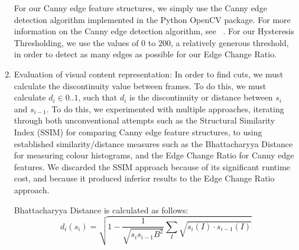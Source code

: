 \documentclass[12pt]{article}
\begin{document}
\begin{enumerate}
    For our Canny edge feature structures, we simply use the Canny edge detection algorithm implemented in the Python OpenCV package. For more information on the Canny edge 
    detection algorithm, see ~\cite{canny}. For our Hysteresis Thresholding, we use the values of $0$ to $200$, a relatively generous threshold, in order to detect as many edges 
    as possible for our Edge Change Ratio. 
    \item Evaluation of visual content representation: In order to find cuts, we must calculate the discontinuity value between frames. To do this, we must calculate 
    $d_i \in 0 .. 1$, such that $d_i$ is the discontinuity or distance between $s_i$ and $s_{i-1}$. To do this, we experimented with multiple approaches, iterating through 
    both unconventional attempts such as the Structural Similarity Index (SSIM) for comparing Canny edge feature structures, to using established similarity/distance measures such 
    as the Bhattacharyya Distance for measuring colour histograms, and the Edge Change Ratio for Canny edge features. We discarded the SSIM approach because
    of its significant runtime cost, and because it produced inferior results to the Edge Change Ratio approach.

    Bhattacharyya Distance is calculated as follows: 
    $$d_i(s_i) = \sqrt{1 - \frac{1}{\sqrt{s_is_{i-1}B^2}}\sum_{I}\sqrt{s_i(I) \cdot s_{i-1}(I)}}$$
    

\end{enumerate}
\end{document}
